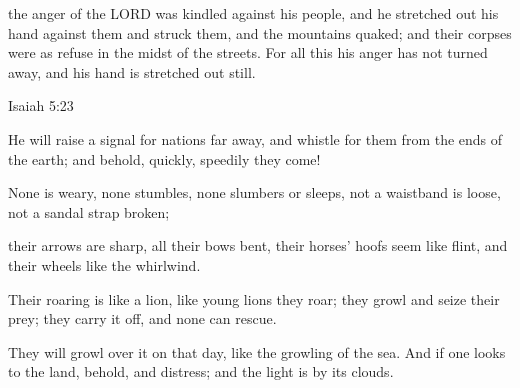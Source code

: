 \documentclass[11pt]{article}
\begin{document}
\begin{biblicaloutline}[Isaiah 5:18-25 (B')]
\begin{versesection}{2em}
          the anger of the LORD was kindled against his people,
        \poetryline and he stretched out his hand against them and struck them,
        \poetryline and the mountains quaked;
        and their corpses were as refuse
        \poetryline in the midst of the streets.
        For all this his anger has not turned away,
        \poetryline and his hand is stretched out still.
    \end{versesection}

\end{biblicaloutline}

\vspace{2em}

\begin{biblecomparison}{Isaiah 5:23}
\end{biblecomparison}

\vspace{2em}

\begin{biblicaloutline}[Isaiah 5:26-30 (A')]

    \begin{versesection}{2em}
         He will raise a signal for nations far away,
        \poetryline and whistle for them from the ends of the earth;
        \poetryline and behold, quickly, speedily they come!
        
         None is weary, none stumbles,
        \poetryline none slumbers or sleeps,
        not a waistband is loose,
        \poetryline not a sandal strap broken;
        
         their arrows are sharp,
        \poetryline all their bows bent,
        their horses' hoofs seem like flint,
        \poetryline and their wheels like the whirlwind.
        
         Their roaring is like a lion,
        \poetryline like young lions they roar;
        they growl and seize their prey;
        \poetryline they carry it off, and none can rescue.
        
         They will growl over it on that day,
        \poetryline like the growling of the sea.
        And if one looks to the land,
        \poetryline behold,  and distress;
        and the light is  by its clouds.
    \end{versesection}

\end{biblicaloutline}
\end{document}
